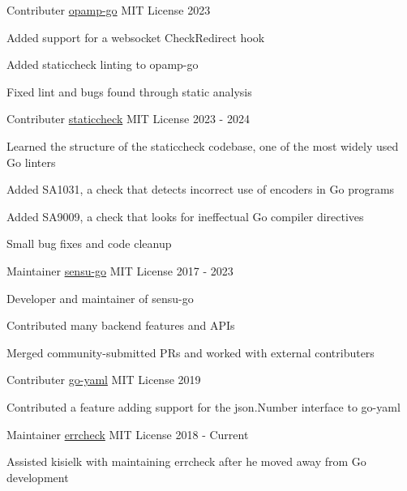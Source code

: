 


\begin{cventries}

  \cventry
    {Contributer}
    {\href{https://github.com/open-telemetry/opamp-go}{opamp-go}}
    {MIT License}
    {2023}
    {
      \begin{cvitems}
        \item{Added support for a websocket CheckRedirect hook}
        \item{Added staticcheck linting to opamp-go}
        \item{Fixed lint and bugs found through static analysis}
      \end{cvitems}
    }


  \cventry
    {Contributer}
    {\href{https://github.com/dominikh/go-tools}{staticcheck}}
    {MIT License}
    {2023 - 2024}
    {
      \begin{cvitems}
        \item{Learned the structure of the staticcheck codebase, one of the most widely used Go linters}
        \item{Added SA1031, a check that detects incorrect use of encoders in Go programs}
        \item{Added SA9009, a check that looks for ineffectual Go compiler directives}
        \item{Small bug fixes and code cleanup}
      \end{cvitems}
    }


  \cventry
    {Maintainer}
    {\href{https://github.com/sensu/sensu-go}{sensu-go}}
    {MIT License}
    {2017 - 2023}
    {
      \begin{cvitems}
        \item{Developer and maintainer of sensu-go}
        \item{Contributed many backend features and APIs}
        \item{Merged community-submitted PRs and worked with external contributers}
      \end{cvitems}
    }


  \cventry
    {Contributer}
    {\href{https://github.com/go-yaml/yaml}{go-yaml}}
    {MIT License}
    {2019}
    {
      \begin{cvitems}
        \item{Contributed a feature adding support for the json.Number interface to go-yaml}
      \end{cvitems}
    }


  \cventry
  	{Maintainer}
  	{\href{https://github.com/kisielk/errcheck}{errcheck}}
  	{MIT License}
  	{2018 - Current}
  	{
	  \begin{cvitems}
	  	\item{Assisted kisielk with maintaining errcheck after he moved away from Go development}
	  \end{cvitems}
  	}
\end{cventries}
